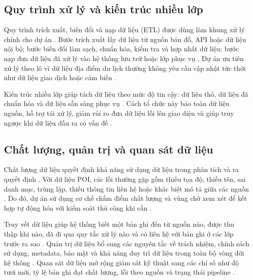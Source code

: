 \subsection{Quy trình xử lý và kiến trúc nhiều lớp}

Quy trình trích xuất, biến đổi và nạp dữ liệu (ETL) được dùng làm khung xử lý chính cho dự án \cite{ibmETL}. Bước trích xuất lấy dữ liệu từ nguồn bản đồ, API hoặc dữ liệu nội bộ; bước biến đổi làm sạch, chuẩn hóa, kiểm tra và hợp nhất dữ liệu; bước nạp đưa dữ liệu đã xử lý vào hệ thống lưu trữ hoặc lớp phục vụ \cite{ibmETL}. Dự án ưu tiên xử lý theo lô vì dữ liệu địa điểm du lịch thường không yêu cầu cập nhật tức thời như dữ liệu giao dịch hoặc cảm biến \cite{awsStreaming}.\par

Kiến trúc nhiều lớp giúp tách dữ liệu theo mức độ tin cậy: dữ liệu thô, dữ liệu đã chuẩn hóa và dữ liệu sẵn sàng phục vụ \cite{databricksMedallion}. Cách tổ chức này bảo toàn dữ liệu nguồn, hỗ trợ tái xử lý, giảm rủi ro đưa dữ liệu lỗi lên giao diện và giúp truy ngược khi dữ liệu đầu ra có vấn đề \cite{ibmLineage}.\par

\subsection{Chất lượng, quản trị và quan sát dữ liệu}

Chất lượng dữ liệu quyết định khả năng sử dụng dữ liệu trong phân tích và ra quyết định \cite{ibmDataQuality}. Với dữ liệu POI, các lỗi thường gặp gồm thiếu tọa độ, thiếu tên, sai danh mục, trùng lặp, thiếu thông tin liên hệ hoặc khác biệt mô tả giữa các nguồn \cite{yeboah2021}. Do đó, dự án sử dụng cơ chế chấm điểm chất lượng và vùng chờ xem xét để kết hợp tự động hóa với kiểm soát thủ công khi cần \cite{ibmDataQuality}.\par

Truy vết dữ liệu giúp hệ thống biết một bản ghi đến từ nguồn nào, được thu thập khi nào, đã đi qua quy tắc xử lý nào và có liên hệ với bản ghi ở các lớp trước ra sao \cite{ibmLineage}. Quản trị dữ liệu bổ sung các nguyên tắc về trách nhiệm, chính sách sử dụng, metadata, bảo mật và khả năng duy trì dữ liệu trong toàn bộ vòng đời hệ thống \cite{damaDmbok}. Quan sát dữ liệu mở rộng giám sát kỹ thuật sang các chỉ số như độ tươi mới, tỷ lệ bản ghi đạt chất lượng, lỗi theo nguồn và trạng thái pipeline \cite{opentelemetrySignals}.\par


